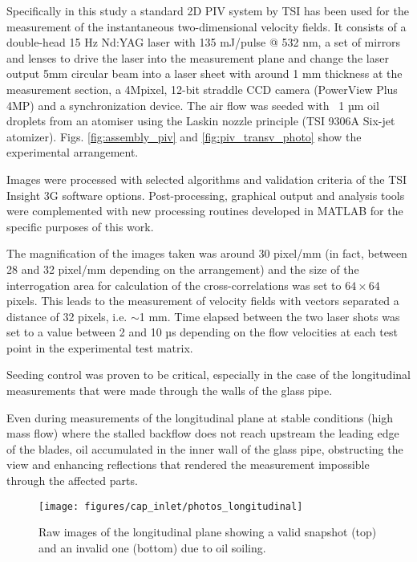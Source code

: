 Specifically in this study a standard 2D PIV system by TSI has been used for the measurement of the instantaneous two-dimensional velocity fields. It consists of a double-head 15 Hz Nd:YAG laser with 135 mJ/pulse @ 532 nm, a set of mirrors and lenses to drive the laser into the measurement plane and change the laser output 5mm circular beam into a laser sheet with around 1 mm thickness at the measurement section, a 4Mpixel, 12-bit straddle CCD camera (PowerView Plus 4MP) and a synchronization device.
The air flow was seeded with ~1 µm oil droplets from an atomiser using the Laskin nozzle principle (TSI 9306A Six-jet atomizer). Figs. \ref{fig:assembly_piv} and \ref{fig:piv_transv_photo} show the experimental arrangement.

Images were processed with selected algorithms and validation criteria of the TSI Insight 3G software options. Post-processing, graphical output and analysis tools were complemented with new processing routines developed in MATLAB for the specific purposes of this work.

The magnification of the images taken was around 30 pixel/mm (in fact, between 28 and 32 pixel/mm depending on the arrangement) and the size of the interrogation area for calculation of the cross-correlations was set to $64\times 64$ pixels. This leads to the measurement of velocity fields with vectors separated a distance of 32 pixels, i.e. $\sim$1 mm. Time elapsed between the two laser shots was set to a value between 2 and 10 µs depending on the flow velocities at each test point in the experimental test matrix.

Seeding control was proven to be critical, especially in the case of the longitudinal measurements that were made through the walls of the glass pipe.

Even during measurements of the longitudinal plane at stable conditions (high mass flow) where the stalled backflow does not reach upstream the leading edge of the blades, oil accumulated in the inner wall of the glass pipe, obstructing the view and enhancing reflections that rendered the measurement impossible through the affected parts.

\begin{figure}[!t]
\centering
\texttt{[image: figures/cap\_inlet/photos\_longitudinal]}
\caption[Raw images of the longitudinal plane PIV measurement]{Raw images of the longitudinal plane showing a valid snapshot (top) and an invalid one (bottom) due to oil soiling.}
\label{fig:photos_longitudinal}
\end{figure}

